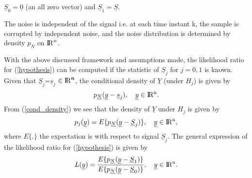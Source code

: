 \documentclass[a4paper,english,12pt]{article}
\begin{document}
\begin{assum}
$\underline{S}_{0}=\underline{0}$ (an all zero vector) and $\underline{S}_{1}=\underline{S}$.
\end{assum}
\begin{assum}
The noise is independent of the signal i.e. at each time instant k, the sample is corrupted by independent noise, and the noise distribution is determined by density $p_{N}$ on ${\rm I\!R}^{n}$.
\end{assum}
With the above discussed framework and assumptions made, the likelihood ratio for (\ref{hypothesis}) can be computed if the statistic of $\underline{S}_{j}$ for $j=0,1$ is known. Given that $\underline{S}_{j}$=$\underline{s}_{j}$ $\in {\rm I\!R}^{\textbf{n}}$, the conditional density of $\underline{Y}$ (under $H_{j}$) is given by 
\begin{equation}
\label{cond_density}
p_{\underline{N}}(\underline{y}-\underline{s}_{j}),\hspace{10pt}\underline{y}\in{\rm I\!R}^{\text{n}}.
\end{equation}
From (\ref{cond_density}) we see that the density of $\underline{Y}$ under $H_{j}$ is given by
\begin{equation}
\label{density}
p_{j}(\underline{y})=E\{p_{\underline{N}}(\underline{y}-\underline{S}_{j})\},\hspace{10pt}\underline{y}\in{\rm I\!R}^{\text{n}},
\end{equation}
where $E\{.\}$ the expectation is with respect to signal $\underline{S}_{j}$. The general expression of the likelihood ratio for (\ref{hypothesis}) is given by
\begin{equation}
\label{L(y)}
L(\underline{y})=\frac{E\{p_{\underline{N}}(\underline{y}-\underline{S}_{1})\}}{E\{p_{\underline{N}}(\underline{y}-\underline{S}_{0})\}},\hspace{10pt}\underline{y}\in{\rm I\!R}^{\text{n}}.
\end{equation}
\end{document}
